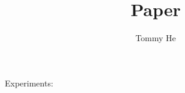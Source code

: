 \documentclass[11pt]{article}
\title{Paper}
\author{Tommy He}
\date{}
\begin{document}
\maketitle
Experiments:
\end{document}
